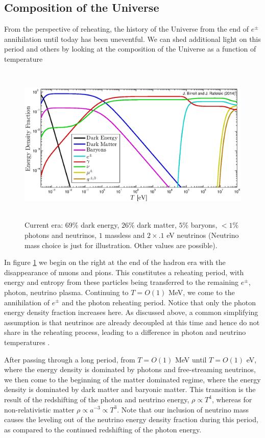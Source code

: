 \subsection{Composition of the Universe}
From the perspective of reheating, the history of the Universe from the end of $e^\pm$ annihilation until today has been uneventful. We can shed additional light on this period and others by looking at the composition of the Universe as a function of temperature

\begin{figure}
\centerline{\hspace*{0.4cm}\includegraphics[height=7.6cm]{04-birrell/ErasOfUniverse/energy_densities_total.eps}}\label{fig:energy_frac}
\caption{Current era: $69\%$ dark energy, $26\%$ dark matter, $5\%$ baryons, $<1\%$ photons and neutrinos, $1$ massless and $2\times .1$ eV neutrinos (Neutrino mass choice is just for illustration. Other values are possible).}
 \end{figure}
In figure \ref{fig:energy_frac} we begin on the right at the end of the hadron era with the disappearance of muons and pions. This constitutes a reheating period, with energy and entropy from these particles being transferred to the remaining $e^\pm$, photon, neutrino plasma. Continuing to $T=O(1)$ MeV, we come to the annihilation of $e^\pm$ and the photon reheating period. Notice that only the photon energy density fraction increases here. As discussed above, a common simplifying assumption is that neutrinos are already decoupled at this time and hence do not share in the reheating process, leading to a difference in photon and neutrino temperatures .

After passing through a long period, from $T=O(1)$ MeV until $T=O(1)$ eV, where the energy density is dominated by photons and free-streaming neutrinos, we then come to the beginning of the matter dominated regime, where the energy density is dominated by dark matter and baryonic matter. This transition is the result of the redshifting of the photon and neutrino energy, $\rho\propto T^4$, whereas for non-relativistic matter $\rho\propto a^{-3}\propto T^3$. Note that our inclusion of neutrino mass causes the leveling out of the neutrino energy density fraction during this period, as compared to the continued redshifting of the photon energy.


